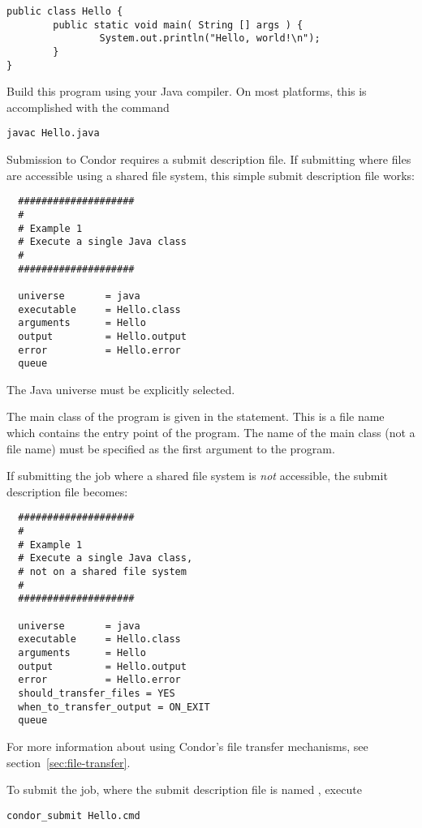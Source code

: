 \begin{verbatim}
public class Hello {
        public static void main( String [] args ) {
                System.out.println("Hello, world!\n");
        }
}
\end{verbatim}

Build this program using your Java compiler.
On most platforms, this is
accomplished with the command
\begin{verbatim}
javac Hello.java
\end{verbatim}

Submission to Condor requires a submit description file.
If submitting where files are accessible using a
shared file system,
this simple submit description file works:

\begin{verbatim}
  ####################
  #
  # Example 1
  # Execute a single Java class
  #
  ####################

  universe       = java
  executable     = Hello.class
  arguments      = Hello
  output         = Hello.output
  error          = Hello.error
  queue
\end{verbatim}

The Java universe must be explicitly selected.

The main class of the program is given in the  statement.
This is a file name which contains the entry point of the program.
The name of the main class (not a file name) must
be specified as the first argument to the program.

If submitting the job where a shared file system is \emph{not}
accessible,
the submit description file becomes:

\begin{verbatim}
  ####################
  #
  # Example 1
  # Execute a single Java class,
  # not on a shared file system
  #
  ####################

  universe       = java
  executable     = Hello.class
  arguments      = Hello
  output         = Hello.output
  error          = Hello.error
  should_transfer_files = YES
  when_to_transfer_output = ON_EXIT
  queue
\end{verbatim}
For more information about using Condor's file transfer mechanisms,
see section~\ref{sec:file-transfer}.

To submit the job, where the submit description file
is named , 
execute 
\begin{verbatim}
condor_submit Hello.cmd
\end{verbatim}


